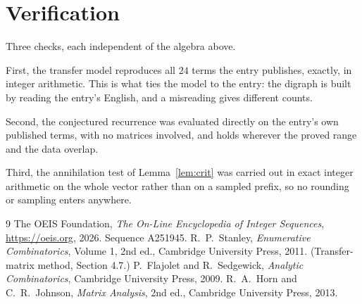 \documentclass[11pt,a4paper]{article}
\theoremstyle{plain}
\theoremstyle{definition}
\begin{document}
\section{Verification}

Three checks, each independent of the algebra above.

First, the transfer model reproduces all $24$ terms the entry publishes, exactly, in
integer arithmetic. This is what ties the model to the entry: the digraph is built by reading
the entry's English, and a misreading gives different counts.

Second, the conjectured recurrence was evaluated directly on the entry's own published terms,
with no matrices involved, and holds wherever the proved range and the data overlap.

Third, the annihilation test of Lemma~\ref{lem:crit} was carried out in exact integer
arithmetic on the whole vector rather than on a sampled prefix, so no rounding or sampling
enters anywhere.

\begin{thebibliography}{9}
 The OEIS Foundation, \emph{The On-Line Encyclopedia of Integer
Sequences}, \url{https://oeis.org}, 2026. Sequence A251945.
 R.~P.~Stanley, \emph{Enumerative Combinatorics}, Volume 1, 2nd ed.,
Cambridge University Press, 2011. (Transfer-matrix method, Section 4.7.)
 P.~Flajolet and R.~Sedgewick, \emph{Analytic Combinatorics}, Cambridge
University Press, 2009.
 R.~A.~Horn and C.~R.~Johnson, \emph{Matrix Analysis}, 2nd ed., Cambridge
University Press, 2013.
\end{thebibliography}
\end{document}
